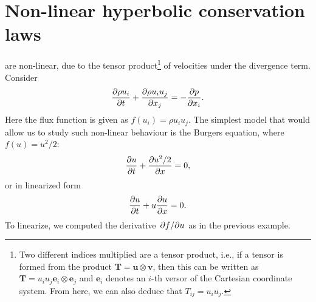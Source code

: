 \documentclass[justified, nobib, a4page]{tufte-handout}
\begin{document}
\begin{marginfigure}
	\begin{center}
	\end{center}
	\caption{Solution to the \(a=x\) example.}\label{fig:ch6}
\end{marginfigure}

\section{Non-linear hyperbolic conservation laws}

 are non-linear, due to the
tensor product\footnote{%
	Two different indices multiplied are a tensor product, i.e., if a tensor is
	formed from the product \(\bm{T} = \bm{u}\otimes\bm{v}\), then this can be
	written as \(\bm{T} = u_i u_j \bm{e}_i\otimes\bm{e}_j\) and \(\bm{e}_i\)
	denotes an \(i\)-th versor of the Cartesian coordinate system. From here, we
	can also deduce that \(T_{ij}= u_i u_j\).
}
of velocities under the divergence term. Consider
\[
	\pdv{\rho u_i}{t} + \pdv{\rho u_i u_j}{x_j} = -\pdv{p}{x_i}.
\]
Here the flux function is given as \(f(u_i) = \rho u_i u_j\).
The simplest model that would allow us to study such non-linear behaviour
is the Burgers equation, where \(f(u) = u^2/2\):
\begin{equation}
	\pdv{u}{t} + \pdv{u^2/2}{x} = 0,
	\label{eq:burgers}
\end{equation}
or in linearized form
\begin{equation}
	\pdv{u}{t} + u\pdv{u}{x} = 0.
	\label{eq:lin-burgers}
\end{equation}
To linearize, we computed the derivative \(\pdv{f}/{u}\) as in the previous
example.
\end{document}
